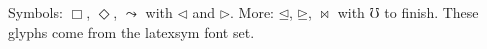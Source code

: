 \documentclass{article}
\begin{document}
Symbols: $\Box$, $\Diamond$, $\leadsto$ with $\lhd$ and $\rhd$.
More: $\unlhd$, $\unrhd$, $\Join$ with $\mho$ to finish.
These glyphs come from the latexsym font set.
\end{document}
